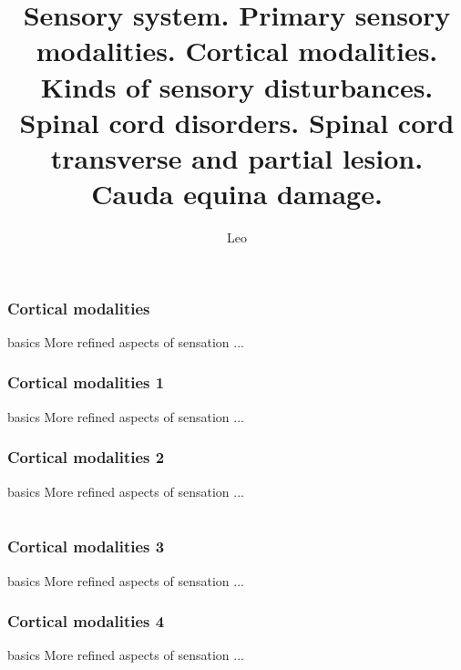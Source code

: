 \documentclass{beamer}
\begin{document}
 
\title{Sensory system. Primary sensory modalities. Cortical modalities. Kinds of sensory disturbances. Spinal cord disorders. Spinal cord transverse and partial lesion. Cauda equina damage.}
\author{Leo}

\section{Cortical modalities}
\begin{frame}{basics} 
    More refined aspects of sensation ...
\end{frame}

\section{Cortical modalities 1}
\begin{frame}{basics} 
    More refined aspects of sensation ...
\end{frame}

\section{Cortical modalities 2}
\begin{frame}{basics} 
    More refined aspects of sensation ...
\end{frame}

\part{}
\section{Cortical modalities 3}
\begin{frame}{basics} 
    More refined aspects of sensation ...
\end{frame}

\section{Cortical modalities 4}
\begin{frame}{basics} 
    More refined aspects of sensation ...
\end{frame}
\end{document}

